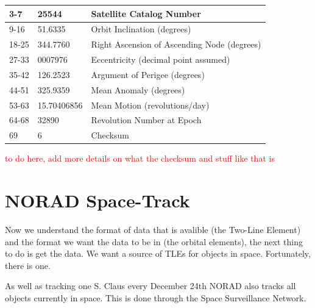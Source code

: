 \documentclass[12pt]{article}
\begin{document}
\begin{table}[h!]
{\begin{tabular}{|l|l|l|}
				3-7                                     & 25544                                   & Satellite Catalog Number                                                        \\ \hline
				9-16                                    & 51.6335                                 & Orbit Inclination (degrees)                                                     \\ \hline
				18-25                                   & 344.7760                                & Right Ascension of Ascending Node (degrees)                                     \\ \hline
				27-33                                   & 0007976                                 & Eccentricity (decimal point assumed)                                            \\ \hline
				35-42                                   & 126.2523                                & Argument of Perigee (degrees)                                                   \\ \hline
				44-51                                   & 325.9359                                & Mean Anomaly (degrees)                                                          \\ \hline
				53-63                                   & 15.70406856                             & Mean Motion (revolutions/day)                                                   \\ \hline
				64-68                                   & 32890                                   & Revolution Number at Epoch                                                      \\ \hline
				69                                      & 6                                       & Checksum                                                                        \\ \hline
			\end{tabular}%
		}
	\end{table}
	
	

	\textcolor{red}{to do here, add more details on what the checksum and stuff like that is}
	
	\par 
		\doublespacing
  
	

	\section{NORAD Space-Track}	
	Now we understand the format of data that is avalible (the Two-Line Element) and the format we want the data to be in (the orbital elements), the next thing to do is get the data. We want a source of TLEs for objects in space. Fortunately, there is one.\par 
	As well as tracking one S. Claus every December 24th\cite{noradSC} NORAD also tracks all objects currently in space. This is done through the Space Surveillance Network\cite{ssncltrak}. 
	
\end{document}
